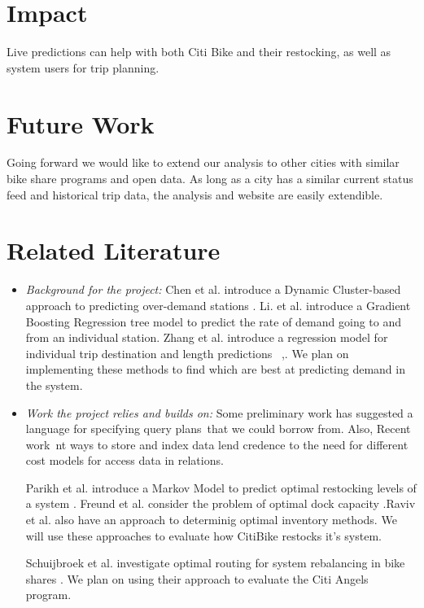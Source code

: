 \documentclass{proc}
\begin{document}
\section{Impact}
Live predictions can help with both Citi Bike and their restocking, as well as system users for trip planning.


\section{Future Work}
Going forward we would like to extend our analysis to other cities with similar bike share programs and open data. As long as a city has a similar current status feed and historical trip data, the analysis and website are easily extendible.


\section{Related Literature}


\begin{itemize}
\item \emph{Background for the project:} Chen et al. introduce a Dynamic Cluster-based approach to predicting over-demand stations \cite{chen}.  Li. et al. introduce a Gradient Boosting Regression tree model to predict the rate of demand going to and from an individual station.  Zhang et al. introduce a regression model for individual trip destination and length predictions~ \cite{zhang},. We plan on implementing these methods to find which are best at predicting demand in the system.





\item \emph{Work the project relies and builds on: } Some preliminary work has suggested a language for specifying query plans~that we could borrow from.  Also, Recent work~nt ways to store and index data lend credence to the need for different cost models for access data in relations.



Parikh et al. introduce a Markov Model to predict optimal restocking levels of a system \cite{parikh}. Freund et al. consider the problem of optimal dock capacity \cite{freund}.Raviv et al. also have an approach to determinig optimal inventory methods. We will use these approaches to evaluate how CitiBike restocks it's system.

Schuijbroek et al. investigate optimal routing for system rebalancing in bike shares \cite{schu}. We plan on using their approach to evaluate the Citi Angels program.
\end{itemize}
\end{document}
